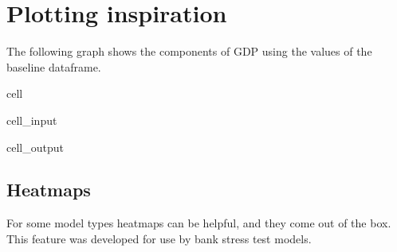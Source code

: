 \documentclass[letterpaper,10pt,english]{jupyterBook}
\begin{document}
\section{Plotting inspiration}
\label{\detokenize{content/Python/modelflow_features:plotting-inspiration}}
\sphinxAtStartPar
The following graph shows the components of GDP using the values of the baseline dataframe.

\begin{sphinxuseclass}{cell}\begin{sphinxVerbatimInput}

\begin{sphinxuseclass}{cell_input}
\begin{sphinxVerbatim}[commandchars=\\\{\}]
\PYG{p}{[}\PYG{p}{]}\PYGZbs{}
\PYGZbs{}
 
\end{sphinxVerbatim}

\end{sphinxuseclass}\end{sphinxVerbatimInput}
\begin{sphinxVerbatimOutput}

\begin{sphinxuseclass}{cell_output}
\noindent{}

\end{sphinxuseclass}\end{sphinxVerbatimOutput}

\end{sphinxuseclass}

\subsection{Heatmaps}
\label{\detokenize{content/Python/modelflow_features:heatmaps}}
\sphinxAtStartPar
For some model types heatmaps can be helpful, and they come out of the box. This feature was developed for use by bank stress test models.
\end{document}

